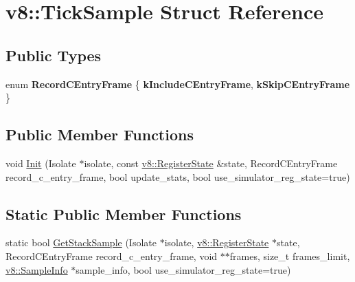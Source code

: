 \hypertarget{structv8_1_1TickSample}{}\section{v8\+:\+:Tick\+Sample Struct Reference}
\label{structv8_1_1TickSample}
\subsection*{Public Types}
\begin{DoxyCompactItemize}
\item 
\mbox{\label{structv8_1_1TickSample_ae3223c2114f7140f8af1793802b94d42}} 
enum {\bfseries Record\+C\+Entry\+Frame} \{ {\bfseries k\+Include\+C\+Entry\+Frame}, 
{\bfseries k\+Skip\+C\+Entry\+Frame}
 \}
\end{DoxyCompactItemize}
\subsection*{Public Member Functions}
\begin{DoxyCompactItemize}
\item 
void \mbox{\hyperlink{structv8_1_1TickSample_a5e763b4b249b3fba53241b82d4ef6eeb}{Init}} (Isolate $\ast$isolate, const \mbox{\hyperlink{structv8_1_1RegisterState}{v8\+::\+Register\+State}} \&state, Record\+C\+Entry\+Frame record\+\_\+c\+\_\+entry\+\_\+frame, bool update\+\_\+stats, bool use\+\_\+simulator\+\_\+reg\+\_\+state=true)
\end{DoxyCompactItemize}
\subsection*{Static Public Member Functions}
\begin{DoxyCompactItemize}
\item 
static bool \mbox{\hyperlink{structv8_1_1TickSample_a297e05d112f3c749bfead215393646c1}{Get\+Stack\+Sample}} (Isolate $\ast$isolate, \mbox{\hyperlink{structv8_1_1RegisterState}{v8\+::\+Register\+State}} $\ast$state, Record\+C\+Entry\+Frame record\+\_\+c\+\_\+entry\+\_\+frame, void $\ast$$\ast$frames, size\+\_\+t frames\+\_\+limit, \mbox{\hyperlink{structv8_1_1SampleInfo}{v8\+::\+Sample\+Info}} $\ast$sample\+\_\+info, bool use\+\_\+simulator\+\_\+reg\+\_\+state=true)
\end{DoxyCompactItemize}
